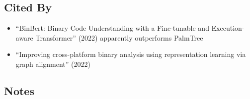 \documentclass{article}
\begin{document}
\subsection*{Cited By}
\begin{itemize}
	\item ``BinBert: Binary Code Understanding with a Fine-tunable and Execution-aware Transformer'' (2022) apparently outperforms PalmTree
	\item ``Improving cross-platform binary analysis using representation learning via graph alignment'' (2022)
\end{itemize}

\subsection*{Notes}
\end{document}
